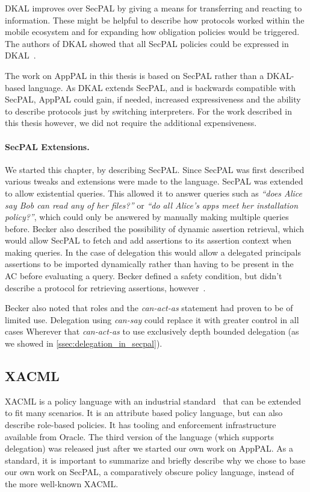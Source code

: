 \documentclass[thesis.tex]{subfiles}
\begin{document}
DKAL improves over SecPAL by giving a means for transferring and
reacting to information. These might be helpful to describe how
protocols worked within the mobile ecosystem and for expanding how
obligation policies would be triggered.  The authors of DKAL showed
that all SecPAL policies could be expressed in
DKAL~\cite{gurevich_dkal:_2008}. 

The work on AppPAL in this thesis is based on SecPAL rather than a DKAL-based language. 
As DKAL extends SecPAL, and is backwards compatible with SecPAL, AppPAL could gain, if needed,
increased expressiveness and the ability to describe protocols just by switching interpreters.
For the work described in this thesis however, we did not require the additional expensiveness.

\paragraph*{SecPAL Extensions.}
We started this chapter, by describing SecPAL. Since SecPAL was first described
various tweaks and extensions were made to the language. SecPAL was extended to
allow existential queries. This allowed it to answer
queries such as \emph{``does Alice say Bob can read any of her files?''} or
\emph{``do all Alice's apps meet her installation policy?''}, which could only
be answered by manually making multiple queries before. 
%
Becker also described the possibility of dynamic assertion retrieval, which
would allow SecPAL to fetch and add assertions to its assertion context when
making queries. In the case of delegation this would allow a delegated
principals assertions to be imported dynamically rather than having to be
present in the AC before evaluating a query. Becker defined a safety condition,
but didn't describe a protocol for retrieving assertions,
however~\cite{moritz_y_becker_secpal:_2009}.

Becker also noted that roles and the \emph{can-act-as} statement had proven to
be of limited use. Delegation using \emph{can-say} could replace it with greater
control in all cases Wherever that \emph{can-act-as} to use exclusively depth
bounded delegation (as we showed in \autoref{ssec:delegation_in_secpal}). 


\subsection{XACML}

XACML is a policy language with an industrial
standard~\cite{oasis_extensible_2013} that can be extended to fit many
scenarios. It is an attribute based policy language, but can also describe
role-based policies. It has tooling and enforcement infrastructure available
from Oracle.  The third version of the language (which supports delegation) was
released just after we started our own work on AppPAL.
%
As a standard, it is important to summarize and briefly describe
why we chose to base our own work on SecPAL, a comparatively obscure policy
language, instead of the more well-known XACML.
\end{document}
